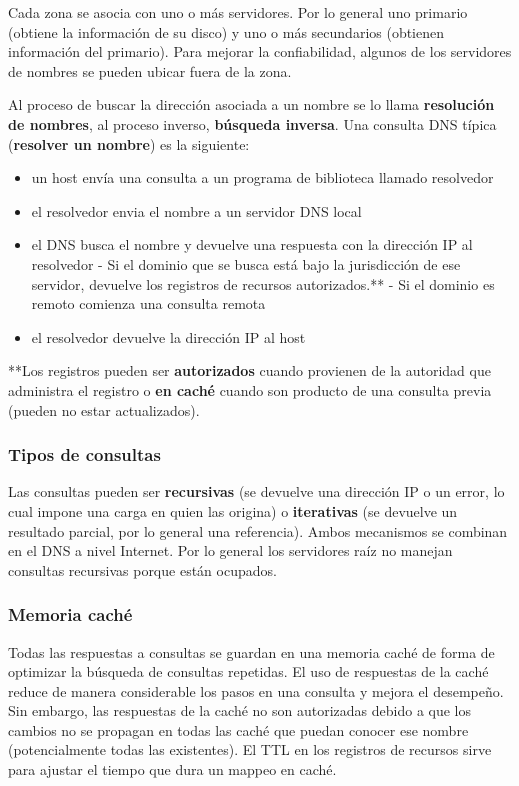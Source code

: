 \documentclass{book}
\begin{document}
	\vspace{3mm}
	Cada zona se asocia con uno o más servidores. Por lo general uno primario (obtiene la información de su disco) y uno o más secundarios (obtienen información del primario). Para mejorar la confiabilidad, algunos de los servidores de nombres se pueden ubicar fuera de la zona.
	
	\pagebreak
	Al proceso de buscar la dirección asociada a un nombre se lo llama \textbf{resolución de nombres}, al proceso inverso, \textbf{búsqueda inversa}. Una consulta DNS típica (\textbf{resolver un nombre}) es la siguiente:
	\begin{itemize}
		\item un host envía una consulta a un programa de biblioteca llamado resolvedor
		\item el resolvedor envia el nombre a un servidor DNS local
		\item el DNS busca el nombre y devuelve una respuesta con la dirección IP al resolvedor
		\subitem - Si el dominio que se busca está bajo la jurisdicción de ese servidor, devuelve los registros de recursos autorizados.**
		\subitem - Si el dominio es remoto comienza una consulta remota
		
		\item el resolvedor devuelve la dirección IP al host
	\end{itemize}
	
	**Los registros pueden ser \textbf{autorizados} cuando provienen de la autoridad que administra el registro o \textbf{en caché} cuando son producto de una consulta previa (pueden no estar actualizados).
	
	\subsubsection{Tipos de consultas}
	Las consultas pueden ser \textbf{recursivas} (se devuelve una dirección IP o un error, lo cual impone una carga en quien las origina) o \textbf{iterativas} (se devuelve un resultado parcial, por lo general una referencia). Ambos mecanismos se combinan en el DNS a nivel Internet. Por lo general los servidores raíz no manejan consultas recursivas porque están ocupados.
	
	\subsubsection{Memoria caché}
	Todas las respuestas a consultas se guardan en una memoria caché de forma de optimizar la búsqueda de consultas repetidas. El uso de respuestas de la caché reduce de manera considerable los pasos en una consulta y mejora el desempeño. Sin embargo, las respuestas de la caché no son autorizadas debido a que los cambios no se propagan en todas las caché que puedan conocer ese nombre (potencialmente todas las existentes). El TTL en los registros de recursos sirve para ajustar el tiempo que dura un mappeo en caché.
	
\end{document}
